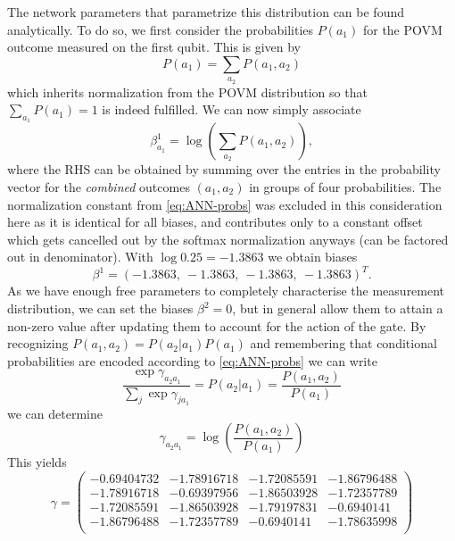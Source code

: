\documentclass[a4]{article}
\begin{document}
The network parameters that parametrize this distribution can be found
analytically. To do so, we first consider the probabilities $P(a_1)$ for the
POVM outcome measured on the first qubit. This is given by
\begin{equation*}
    P(a_1) = \sum_{a_2}P(a_1,a_2)
\end{equation*}
which inherits normalization from the POVM distribution so that $\sum_{a_1}
P(a_1) = 1$ is indeed fulfilled. We can now simply associate
\begin{equation*}
    \beta^1_{a_1} = \log{\left(\sum_{a_2}P(a_1,a_2)\right)},
\end{equation*}
where the RHS can be obtained by summing over the entries in the probability
vector for the \textit{combined} outcomes $(a_1,a_2)$ in groups of four probabilities. The normalization constant from \ref{eq:ANN-probs} was excluded
in this consideration here as it is identical for all biases, and contributes
only to a constant offset which gets cancelled out by the softmax normalization anyways (can be factored out in denominator). With $\log{0.25} = -1.3863$ we
obtain biases
\begin{equation*}
    \beta^1 = ( -1.3863,\:  -1.3863, \: -1.3863, \:  -1.3863)^T.
\end{equation*}
As we have enough free parameters to completely characterise the measurement
 distribution, we can set the biases $\beta^2 = 0$, but in general allow them
 to attain a non-zero value after updating them to account for the action of the
  gate. By recognizing $P(a_1, a_2) = P(a_2|a_1) P(a_1)$ and remembering that
   conditional probabilities are encoded according to \ref{eq:ANN-probs} we can
 write
\begin{equation*}
     \frac{\exp{\gamma_{a_2a_1}}}{\sum_j \exp{\gamma_{ja_1}}} = P(a_2|a_1) =
      \frac{P(a_1, a_2)}{P(a_1)}
\end{equation*}
we can determine
\begin{equation*}
    \gamma_{a_2a_1} = \log{\left(\frac{P(a_1, a_2)}{P(a_1)}\right)}
\end{equation*}
This yields
\begin{equation*}
    \gamma = \begin{pmatrix}   -0.69404732 & -1.78916718 & -1.72085591 &
    -1.86796488\\
   -1.78916718 & -0.69397956 & -1.86503928 & -1.72357789\\
   -1.72085591& -1.86503928 & -1.79197831 &  -0.6940141 \\
   -1.86796488& -1.72357789 &   -0.6940141 & -1.78635998\\ \end{pmatrix}
\end{equation*}
\end{document}

